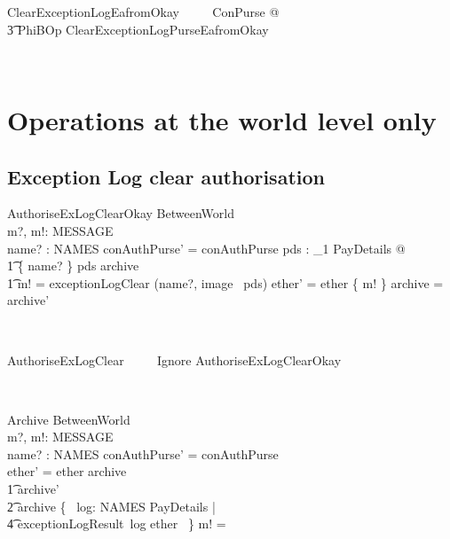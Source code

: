 \begin{LSDef}
\begin{zed}
  ClearExceptionLogEafromOkay ~~~~ \exists \Delta ConPurse @
  \\ \t3                        PhiBOp \land ClearExceptionLogPurseEafromOkay
\end{zed}~\end{LSDef}

\section{Operations at the world level only}\label{ch5.worldop}

\subsection{Exception Log clear authorisation}

\begin{LSDef}
\begin{schema}{AuthoriseExLogClearOkay}
  \Delta BetweenWorld
  \\    m?, m!: MESSAGE
  \\    name? : NAMES
  \where
  conAuthPurse' = conAuthPurse
  \also
  \exists pds : \power_1 PayDetails @
  \\ \t1                \{ name? \} \cross pds \subseteq archive
  \\ \t1                \land m! = exceptionLogClear (name?, image~ pds)
  \also
  ether' = ether \cup \{ m! \}
  \also
  archive = archive'
\end{schema}~\end{LSDef}

\begin{LSDef}
\begin{zed}
  AuthoriseExLogClear ~~~~ Ignore \lor AuthoriseExLogClearOkay
\end{zed}~\end{LSDef}

\begin{LSDef}
\begin{schema}{Archive}
  \Delta BetweenWorld
  \\    m?, m!: MESSAGE
  \\    name? : NAMES
  \where
  conAuthPurse' = conAuthPurse
  \\    ether' = ether
  \also
  archive \subseteq
  \\ \t1                archive' \subseteq
  \\ \t2                archive \cup \{~ log: NAMES \cross PayDetails |
  \\ \t4                                exceptionLogResult~log \in ether ~\}
  \also
  m! = \bot
\end{schema}~\end{LSDef}

